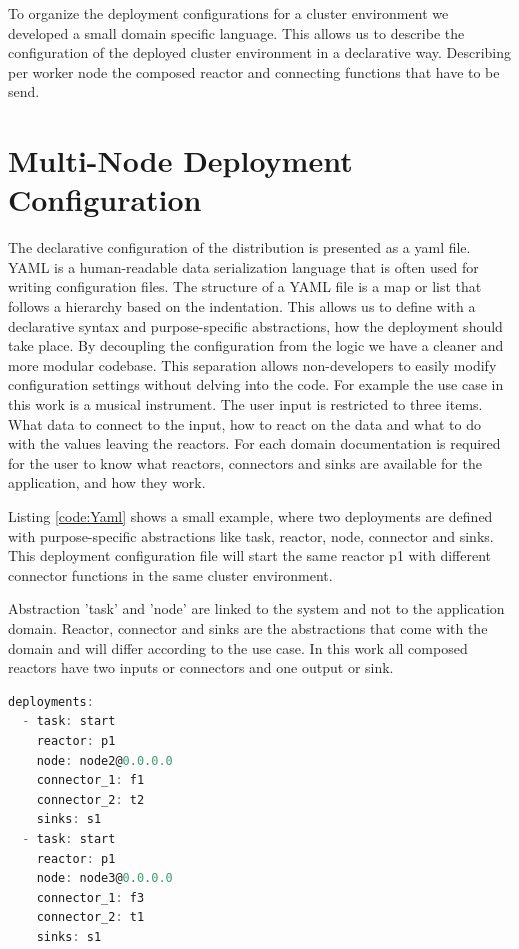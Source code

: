 \documentclass[a4paper]{book}
\begin{document}
To organize the deployment configurations for a cluster environment we developed a small domain specific language. This allows us to describe the configuration of the deployed cluster environment in a declarative way. Describing per worker node the composed reactor and connecting functions that have to be send. 

\section{Multi-Node Deployment Configuration}
The declarative configuration of the distribution is presented as a yaml file. YAML is a human-readable data serialization language that is often used for writing configuration files. The structure of a YAML file is a map or list that follows a hierarchy based on the indentation. This allows us to define with a declarative syntax and purpose-specific abstractions, how the deployment should take place. By decoupling the configuration from the logic we have a cleaner and more modular codebase. This separation allows non-developers to easily modify configuration settings without delving into the code. For example the use case in this work is a musical instrument. The user input is restricted to three items. What data to connect to the input, how to react on the data and what to do with the values leaving the reactors. For each domain documentation is required for the user to know what reactors, connectors and sinks are available for the application, and how they work.

Listing \ref{code:Yaml} shows a small example, where two deployments are defined with purpose-specific abstractions like task, reactor, node, connector and sinks. This deployment configuration file will start the same reactor p1 with different connector functions in the same cluster environment. 

Abstraction 'task' and 'node' are linked to the system and not to the application domain. Reactor, connector and sinks are the abstractions that come with the domain and will differ according to the use case. In this work all composed reactors have two inputs or connectors and one output or sink.


\begin{lstlisting}[language=C, caption={YAML code}, captionpos=b,label={code:Yaml}, basicstyle=\ttfamily, frame=single]
deployments:
  - task: start
    reactor: p1
    node: node2@0.0.0.0
    connector_1: f1
    connector_2: t2
    sinks: s1
  - task: start
    reactor: p1
    node: node3@0.0.0.0
    connector_1: f3
    connector_2: t1
    sinks: s1
\end{lstlisting}
\end{document}
